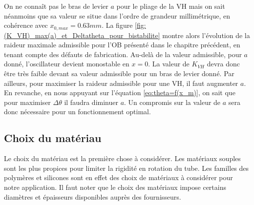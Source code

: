 On ne connaît pas le bras de levier $a$ pour le pliage de la VH mais on sait néanmoins que sa valeur se situe dans l'ordre de grandeur millimétrique, en cohérence avec $x_{0,max} = 0.63mm$. La figure \ref{fig:(K_VH)_max(a)_et_Deltatheta_pour_bistabilite} montre alors l'évolution de la raideur maximale admissible pour l'OB présenté dans le chapitre précédent, en tenant compte des défauts de fabrication. Au-delà de la valeur admissible, pour $a$ donné, l'oscillateur devient monostable en $x=0$. La valeur de $K_{VH}$ devra donc être très faible devant sa valeur admissible pour un bras de levier donné. Par ailleurs, pour maximiser la raideur admissible pour une VH, il faut augmenter $a$. En revanche, en nous appuyant sur l'équation \ref{eq:theta=f(x_m)}, on sait que pour maximiser $\Delta\theta$ il faudra diminuer $a$. Un compromis sur la valeur de $a$ sera donc nécessaire pour un fonctionnement optimal.
	\subsection{Choix du matériau}
	\label{subsec:4.2.2_Choix du matériau}
Le choix du matériau est la première chose à considérer. Les matériaux souples sont les plus propices pour limiter la rigidité en rotation du tube. Les familles des polymères et silicones sont en effet des choix de matériaux à considérer pour notre application. Il faut noter que le choix des matériaux impose certains diamètres et épaisseurs disponibles auprès des fournisseurs.


